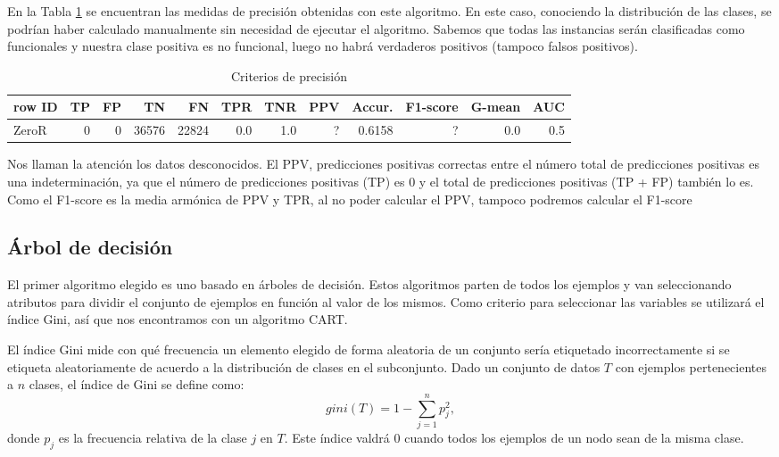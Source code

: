 \documentclass[a4paper, 20pt]{article}
\begin{document}
En la Tabla \ref{tab:zeroR} se encuentran las medidas de precisión obtenidas con este algoritmo. En este caso, conociendo la distribución de las clases, se podrían haber calculado manualmente sin necesidad de ejecutar el algoritmo. Sabemos que todas las instancias serán clasificadas como funcionales y nuestra clase positiva es no funcional, luego no habrá verdaderos positivos (tampoco falsos positivos).

\begin{table}[H]
\centering
\caption{Criterios de precisión}
\label{tab:zeroR}
\begin{tabular}{lrrrrrrrrrrr}
\toprule
row ID & TP & FP & TN & FN & TPR & TNR & PPV & Accur. & F1-score & G-mean & AUC\\ \midrule
ZeroR & 0 & 0 & 36576 & 22824 & 0.0 & 1.0 & ? & 0.6158 & ? & 0.0 & 0.5\\
\bottomrule
\end{tabular}
\end{table}

Nos llaman la atención los datos desconocidos. El PPV, predicciones positivas correctas entre el número total de predicciones positivas es una indeterminación, ya que el número de predicciones positivas (TP) es 0 y el total de predicciones positivas (TP + FP) también lo es. Como el F1-score es la media armónica de PPV y TPR, al no poder calcular el PPV, tampoco podremos calcular el F1-score


\subsection{Árbol de decisión}

El primer algoritmo elegido es uno basado en árboles de decisión. Estos algoritmos parten de todos los ejemplos y van seleccionando atributos para dividir el conjunto de ejemplos en función al valor de los mismos. Como criterio para seleccionar las variables se utilizará el índice Gini, así que nos encontramos con un algoritmo CART.

El índice Gini mide con qué frecuencia un elemento elegido de forma aleatoria de un conjunto sería etiquetado incorrectamente si se etiqueta aleatoriamente de acuerdo a la distribución de clases en el subconjunto. Dado un conjunto de datos $T$ con ejemplos pertenecientes a $n$ clases, el índice de Gini se define como:
\[gini(T) = 1 - \sum_{j=1}^np_j^2,\] donde $p_j$ es la frecuencia relativa de la clase $j$ en $T$. Este índice valdrá 0 cuando todos los ejemplos de un nodo sean de la misma clase.
\end{document}
